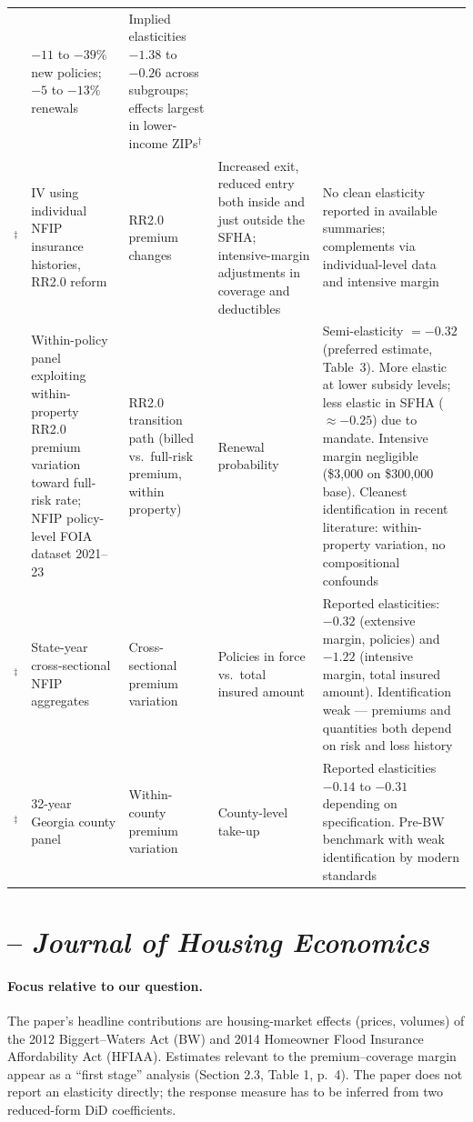 \documentclass[11pt]{article}
\begin{document}
\begin{landscape}
\begin{tabular}{p{3cm} p{4.5cm} p{3.5cm} p{3.5cm} p{6cm}}
& $-11$ to $-39\%$ new policies; $-5$ to $-13\%$ renewals
& Implied elasticities $-1.38$ to $-0.26$ across subgroups; effects largest in lower-income ZIPs$^\dagger$ \\
\citet{ortega2025}$^\ddagger$
& IV using individual NFIP insurance histories, RR2.0 reform
& RR2.0 premium changes
& Increased exit, reduced entry both inside and just outside the SFHA; intensive-margin adjustments in coverage and deductibles
& No clean elasticity reported in available summaries; complements \citet{gourevitch2025} via individual-level data and intensive margin \\
\citet{grubersolomonp2026}
& Within-policy panel exploiting within-property RR2.0 premium variation toward full-risk rate; NFIP policy-level FOIA dataset 2021--23
& RR2.0 transition path (billed vs.\ full-risk premium, within property)
& Renewal probability
& Semi-elasticity $= -0.32$ (preferred estimate, Table~3). More elastic at lower subsidy levels; less elastic in SFHA ($\approx -0.25$) due to mandate. Intensive margin negligible (\$3{,}000 on \$300{,}000 base). Cleanest identification in recent literature: within-property variation, no compositional confounds \\
\citet{browne2000}$^\ddagger$
& State-year cross-sectional NFIP aggregates
& Cross-sectional premium variation
& Policies in force vs.\ total insured amount
& Reported elasticities: $-0.32$ (extensive margin, policies) and $-1.22$ (intensive margin, total insured amount). Identification weak --- premiums and quantities both depend on risk and loss history \\
\citet{atreya2015}$^\ddagger$
& 32-year Georgia county panel
& Within-county premium variation
& County-level take-up
& Reported elasticities $-0.14$ to $-0.31$ depending on specification. Pre-BW benchmark with weak identification by modern standards \\
\bottomrule
\end{tabular}
\end{landscape}

\clearpage

\section{\citet{hennighausen2023} -- \textit{Journal of Housing Economics}}

\paragraph{Focus relative to our question.}
The paper's headline contributions are housing-market effects (prices, volumes) of the
2012 Biggert--Waters Act (BW) and 2014 Homeowner Flood Insurance Affordability Act
(HFIAA). Estimates relevant to the premium--coverage margin appear as a ``first stage''
analysis (Section 2.3, Table 1, p.\ 4). The paper does not report an elasticity directly;
the response measure has to be inferred from two reduced-form DiD coefficients.
\end{document}

